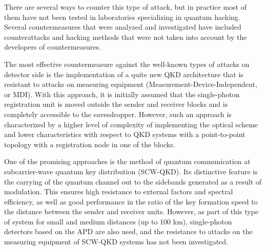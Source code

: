 There are several ways to counter this type of attack, but in practice most of them have not been tested in laboratories specializing in quantum hacking.  Several countermeasures that were analyzed and investigated have included counterattacks and hacking methods that were not taken into account by the developers of countermeasures.
	
The most effective countermeasure against the well-known types of attacks on detector side is the implementation of a  quite new QKD architecture that is resistant to attacks on measuring equipment (Measurement-Device-Independent, or MDI). With this approach, it is initially assumed that the single-photon registration unit is moved outside the sender and receiver blocks and is completely accessible to the eavesdropper. However, such an approach is characterized by a higher level of complexity of implementing the optical scheme and lower characteristics with respect to QKD systems with a point-to-point topology with a registration node in one of the blocks.
	

One of the promising approaches is the method of quantum communication at subcarrier-wave quantum key distribution (SCW-QKD). Its distinctive feature is the carrying of the quantum channel out to the sidebands generated as a result of modulation. This ensures high resistance to external factors and spectral efficiency, as well as good performance in the ratio of the key formation speed to the distance between the sender and receiver units. However, as part of this type of system for small and medium distances (up to 100 km), single-photon detectors based on the APD are also used, and the resistance to attacks on the measuring equipment of SCW-QKD systems has not been investigated.
	
